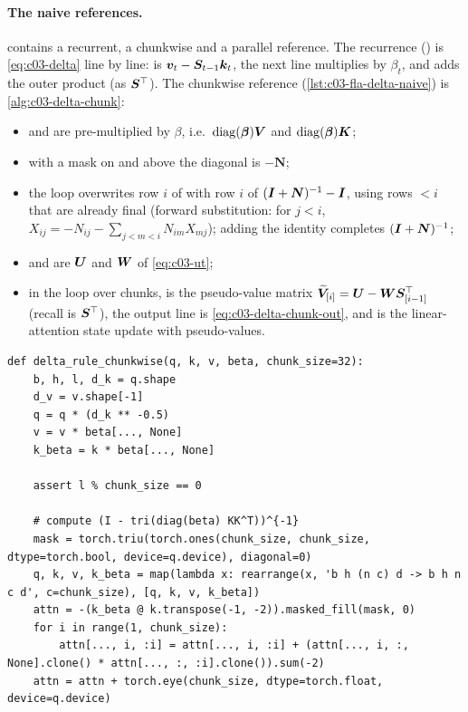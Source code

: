 \begin{sloppypar}
\paragraph{The naive references.}
 contains a
recurrent, a chunkwise and a parallel reference. The recurrence ()
is \cref{eq:c03-delta} line by line:  is
$\bm{v}_t-\bm{S}_{t-1}\bm{k}_t$, the next line multiplies by $\beta_t$, and
 adds the outer product (as $\bm{S}^{\top}$). The
chunkwise reference (\cref{lst:c03-fla-delta-naive}) is \cref{alg:c03-delta-chunk}:
\begin{itemize}
\item {} and  are pre-multiplied by $\beta$, i.e.\ $\operatorname{diag}(\bm{\beta})\bm{V}$ and
$\operatorname{diag}(\bm{\beta})\bm{K}$;
\item {} with a mask on and
above the diagonal is $-\bm{N}$;
\item the  loop overwrites row $i$ of  with row $i$ of
$(\bm{I}+\bm{N})^{-1}-\bm{I}$, using rows $<i$ that are already final (forward substitution: for
$j<i$, $X_{ij}=-N_{ij}-\sum_{j<m<i}N_{im}X_{mj}$); adding the identity completes
$(\bm{I}+\bm{N})^{-1}$;
\item {} and  are $\bm{U}$ and $\bm{W}$ of \cref{eq:c03-ut};
\item in the loop over chunks,  is the pseudo-value
matrix $\widetilde{\bm{V}}_{[i]}=\bm{U}-\bm{W}\bm{S}_{[i-1]}^{\top}$ (recall  is $\bm{S}^{\top}$), the output line
is \cref{eq:c03-delta-chunk-out}, and  is the
linear-attention state update with pseudo-values.
\end{itemize}

\begin{lstlisting}[caption={Excerpt from \texttt{repos/\allowbreak fla-org\_\_flash-linear-attention/\allowbreak fla/\allowbreak ops/\allowbreak delta\_rule/\allowbreak naive.py}: chunkwise delta rule via the WY representation.},label={lst:c03-fla-delta-naive}]
def delta_rule_chunkwise(q, k, v, beta, chunk_size=32):
    b, h, l, d_k = q.shape
    d_v = v.shape[-1]
    q = q * (d_k ** -0.5)
    v = v * beta[..., None]
    k_beta = k * beta[..., None]

    assert l % chunk_size == 0

    # compute (I - tri(diag(beta) KK^T))^{-1}
    mask = torch.triu(torch.ones(chunk_size, chunk_size, dtype=torch.bool, device=q.device), diagonal=0)
    q, k, v, k_beta = map(lambda x: rearrange(x, 'b h (n c) d -> b h n c d', c=chunk_size), [q, k, v, k_beta])
    attn = -(k_beta @ k.transpose(-1, -2)).masked_fill(mask, 0)
    for i in range(1, chunk_size):
        attn[..., i, :i] = attn[..., i, :i] + (attn[..., i, :, None].clone() * attn[..., :, :i].clone()).sum(-2)
    attn = attn + torch.eye(chunk_size, dtype=torch.float, device=q.device)


\end{lstlisting}
\end{sloppypar}
